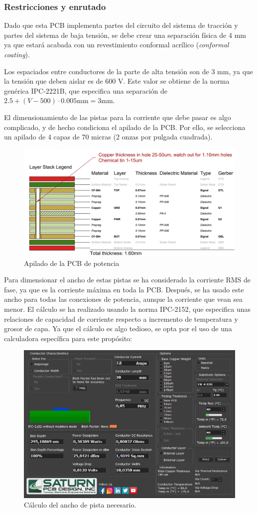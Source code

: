 \subsubsection{Restricciones y enrutado}
Dado que esta PCB implementa partes del circuito del sistema de tracción y partes del sistema de baja tensión, se debe crear una separación física de 4 mm ya que estará acabada con un revestimiento conformal acrílico (\textit{conformal coating}).

Los espaciados entre conductores de la parte de alta tensión son de 3 mm, ya que la tensión que deben aislar es de 600 V. Este valor se obtiene de la norma genérica IPC-2221B, que especifica una separación de $2.5+(V-500)\cdot0.005 \text{mm} = 3 \text{mm}$.

El dimensionamiento de las pistas para la corriente que debe pasar es algo complicado, y de hecho condiciona el apilado de la PCB. Por ello, se selecciona un apilado de 4 capas de 70 micras (2 onzas por pulgada cuadrada).

\begin{figure}[H]
	\centering
	\includegraphics[width=0.7\linewidth]{fig/stackup_power}
	\caption{Apilado de la PCB de potencia}
\end{figure}

Para dimensionar el ancho de estas pistas se ha considerado la corriente RMS de fase, ya que es la corriente máxima en toda la PCB. Después, se ha usado este ancho para todas las conexiones de potencia, aunque la corriente que vean sea menor. El cálculo se ha realizado usando la norma IPC-2152, que especifica unas relaciones de capacidad de corriente respecto a incremento de temperatura y grosor de capa. Ya que el cálculo es algo tedioso, se opta por el uso de una calculadora específica para este propósito:

\begin{figure}[H]
	\centering
	\includegraphics[width=0.7\linewidth]{fig/width}
	\caption{Cálculo del ancho de pista necesario.}
\end{figure}

